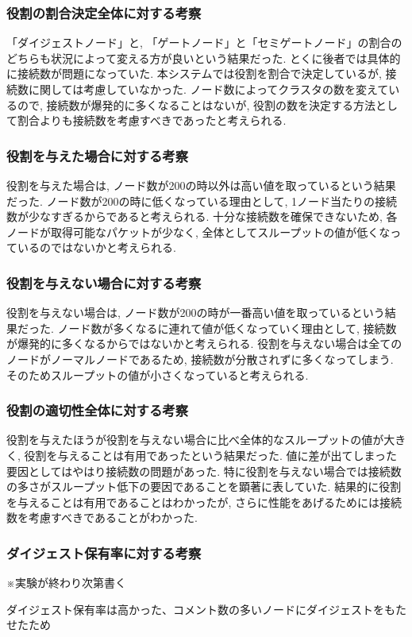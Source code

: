 \subsubsection{役割の割合決定全体に対する考察}
「ダイジェストノード」と, 「ゲートノード」と「セミゲートノード」の割合のどちらも状況によって変える方が良いという結果だった. とくに後者では具体的に接続数が問題になっていた. 本システムでは役割を割合で決定しているが, 接続数に関しては考慮していなかった. ノード数によってクラスタの数を変えているので, 接続数が爆発的に多くなることはないが, 役割の数を決定する方法として割合よりも接続数を考慮すべきであったと考えられる.

\subsubsection{役割を与えた場合に対する考察}
役割を与えた場合は, ノード数が200の時以外は高い値を取っているという結果だった. ノード数が200の時に低くなっている理由として, 1ノード当たりの接続数が少なすぎるからであると考えられる. 十分な接続数を確保できないため, 各ノードが取得可能なパケットが少なく, 全体としてスループットの値が低くなっているのではないかと考えられる.

\subsubsection{役割を与えない場合に対する考察}
役割を与えない場合は, ノード数が200の時が一番高い値を取っているという結果だった. ノード数が多くなるに連れて値が低くなっていく理由として, 接続数が爆発的に多くなるからではないかと考えられる. 役割を与えない場合は全てのノードがノーマルノードであるため, 接続数が分散されずに多くなってしまう. そのためスループットの値が小さくなっていると考えられる.

\subsubsection{役割の適切性全体に対する考察}
役割を与えたほうが役割を与えない場合に比べ全体的なスループットの値が大きく, 役割を与えることは有用であったという結果だった. 値に差が出てしまった要因としてはやはり接続数の問題があった. 特に役割を与えない場合では接続数の多さがスループット低下の要因であることを顕著に表していた. 結果的に役割を与えることは有用であることはわかったが, さらに性能をあげるためには接続数を考慮すべきであることがわかった.

\subsubsection{ダイジェスト保有率に対する考察}
※実験が終わり次第書く

ダイジェスト保有率は高かった、コメント数の多いノードにダイジェストをもたせたため
